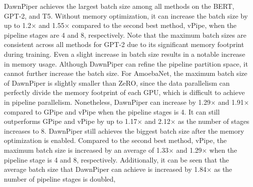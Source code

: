 DawnPiper achieves the largest batch size among all methods on the BERT, GPT-2, and T5.
Without memory optimization, it can increase the batch size by up to 1.2$\times$ and 1.55$\times$
compared to the second best method, vPipe, when the pipeline stages are 4 and 8, respectively.
Note that the maximum batch sizes are consistent across all methods for GPT-2
due to its significant memory footprint during training.
Even a slight increase in batch size results in a notable increase in memory usage.
Although DawnPiper can refine the pipeline partition space,
it cannot further increase the batch size.
For AmoebaNet, the maximum batch size of DawnPiper is slightly smaller than ZeRO,
since the data parallelism can perfectly divide the memory footprint of each GPU,
which is difficult to achieve in pipeline parallelism.
Nonetheless, DawnPiper can increase by 1.29$\times$ and 1.91$\times$
compared to GPipe and vPipe when the pipeline stages is 4.
It can still outperforms GPipe and vPipe by up to 1.17$\times$ and 2.12$\times$
as the number of stages increases to 8.
DawnPiper still achieves the biggest batch size after the memory optimization is enabled.
Compared to the second best method, vPipe, the maximum batch size is increased
by an average of 1.33$\times$ and 1.29$\times$ when the pipeline stage is 4 and 8, respectively.
Additionally, it can be seen that the average batch size that
DawnPiper can achieve is increased by 1.84$\times$
as the number of pipeline stages is doubled,
